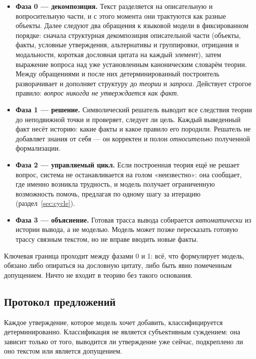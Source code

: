 \documentclass[11pt,a4paper]{article}
\begin{document}
\begin{itemize}
	\item \textbf{Фаза 0 — декомпозиция.} Текст разделяется на описательную и вопросительную части, и с этого момента они трактуются как разные объекты. Далее следуют два обращения к языковой модели в фиксированном порядке: сначала структурная декомпозиция описательной части (объекты, факты, условные утверждения, альтернативы и группировки, отрицания и модальности, короткая дословная цитата на каждый элемент), затем выражение вопроса над уже установленным каноническим словарём теории. Между обращениями и после них детерминированный построитель разворачивает и дополняет структуру до \emph{теории} и \emph{запроса}. Действует строгое правило: \emph{вопрос никогда не утверждается как факт}.
	\item \textbf{Фаза 1 — решение.} Символический решатель выводит все следствия теории до неподвижной точки и проверяет, следует ли цель. Каждый выведенный факт несёт историю: какие факты и какое правило его породили. Решатель не добавляет знания от себя — он корректен и полон \emph{относительно} полученной формализации.
	\item \textbf{Фаза 2 — управляемый цикл.} Если построенная теория ещё не решает вопрос, система не останавливается на голом «неизвестно»: она сообщает, где именно возникла трудность, и модель получает ограниченную возможность помочь, предлагая по одному шагу за итерацию (раздел~\ref{sec:cycle}).
	\item \textbf{Фаза 3 — объяснение.} Готовая трасса вывода собирается \emph{автоматически} из истории вывода, а не моделью. Модель может позже пересказать готовую трассу связным текстом, но не вправе вводить новые факты.
\end{itemize}

Ключевая граница проходит между фазами 0 и 1: всё, что формулирует модель, обязано либо опираться на дословную цитату, либо быть явно помеченным допущением.
Ничто не входит в теорию без такого основания.

\subsection{Протокол предложений}

Каждое утверждение, которое модель хочет добавить, классифицируется детерминированно. Классификация не является субъективным суждением: она зависит
только от того, выводится ли утверждение уже сейчас, подкреплено ли оно текстом или является допущением.
\end{document}
